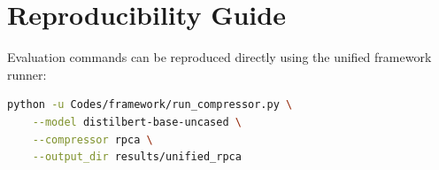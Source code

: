 \section{Reproducibility Guide}
Evaluation commands can be reproduced directly using the unified framework runner:
\begin{lstlisting}[language=bash]
python -u Codes/framework/run_compressor.py \
    --model distilbert-base-uncased \
    --compressor rpca \
    --output_dir results/unified_rpca
\end{lstlisting}
